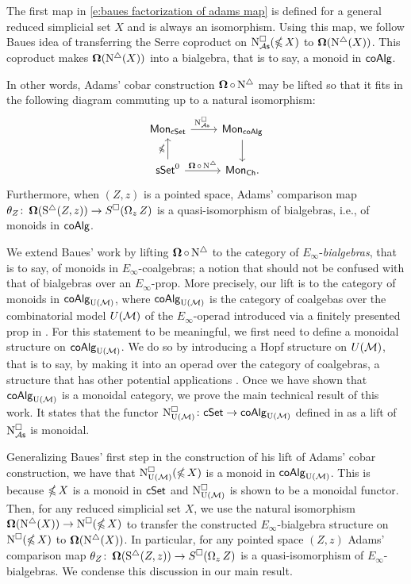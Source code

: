 The first map in \eqref{e:baues factorization of adams map} is defined for a general reduced simplicial set $X$ and is always an isomorphism.
Using this map, we follow Baues idea of transferring the Serre coproduct on $\operatorname{N^{\square}_{{\mathcal{A}\mathsf{s}}}}(\operatorname{\mathbb{\Omega}} X)$ to $\operatorname{\mathbf{\Omega}}(\operatorname{N^{\triangle}}(X))$. This coproduct makes $\operatorname{\mathbf{\Omega}}(\operatorname{N^{\triangle}}(X))$ into a bialgebra, that is to say, a monoid in $\mathsf{coAlg}$.

In other words,  Adams' cobar construction $\operatorname{\mathbf{\Omega}} \circ \operatorname{N^{\triangle}}$ may be lifted so that it fits in the following diagram commuting up to a natural isomorphism:
\[
\begin{tikzcd}
\Mon_{\cSet} \arrow[r, "\cchainsAS \ "] & \Mon_{\coAlg} \arrow[d] \\
\sSet^0 \arrow[r, "\cobar \circ \schains"] \arrow[u, "\ccobar"] & \Mon_{\Ch}.
\end{tikzcd}
\]
Furthermore, when $(Z, z)$ is a pointed space, Adams' comparison map $\theta_Z \colon \operatorname{\mathbf{\Omega}}(\operatorname{S^{\triangle}}(Z, z)) \to S^{\square}(\operatorname{\Omega}_z Z)$ is a quasi-isomorphism of bialgebras, i.e., of monoids in $\mathsf{coAlg}$.

We extend Baues' work by lifting $\operatorname{\mathbf{\Omega}} \circ \operatorname{N^{\triangle}}$ to the category of $E_{\infty}$-\textit{bialgebras}, that is to say, of monoids in $E_{\infty}$-coalgebras; a notion that should not be confused with that of bialgebras over an $E_{\infty}$-prop.
More precisely, our lift is to the category of monoids in $\mathsf{coAlg}_{\operatorname{U}(\mathcal{M})}$, where $\mathsf{coAlg}_{\operatorname{U}(\mathcal{M})}$ is the category of coalgebas over the combinatorial model $U(\mathcal{M})$ of the $E_{\infty}$-operad introduced via a finitely presented prop in \cite{medina2020prop1}.
For this statement to be meaningful, we first need to define a monoidal structure on $\mathsf{coAlg}_{\operatorname{U}(\mathcal{M})}$.
We do so by introducing a Hopf structure on $U(\mathcal{M})$, that is to say, by making it into an operad over the category of coalgebras, a structure that has other potential applications \cite{livernet2008hopf}.
Once we have shown that $\mathsf{coAlg}_{\operatorname{U}(\mathcal{M})}$ is a monoidal category, we prove the main technical result of this work.
It states that the functor $\operatorname{N^{\square}_{{\operatorname{U}(\mathcal{M})}}} \colon \mathsf{cSet} \to \mathsf{coAlg}_{\operatorname{U}(\mathcal{M})}$ defined in \cite{medina2021cubical} as a lift of $\operatorname{N^{\square}_{{\mathcal{A}\mathsf{s}}}}$ is monoidal.

Generalizing Baues' first step in the construction of his lift of Adams' cobar construction, we have that $\operatorname{N^{\square}_{{\operatorname{U}(\mathcal{M})}}}(\operatorname{\mathbb{\Omega}} X)$ is a monoid in $\mathsf{coAlg}_{\operatorname{U}(\mathcal{M})}$.
This is because $\operatorname{\mathbb{\Omega}} X$ is a monoid in $\mathsf{cSet}$ and $\operatorname{N^{\square}_{{\operatorname{U}(\mathcal{M})}}}$ is shown to be a monoidal functor. Then, for any reduced simplicial set $X$, we use the natural isomorphism $\operatorname{\mathbf{\Omega}}(\operatorname{N^{\triangle}}(X)) \to \operatorname{N^{\square}}(\operatorname{\mathbb{\Omega}} X)$ to transfer the constructed $E_{\infty}$-bialgebra structure on $\operatorname{N^{\square}}(\operatorname{\mathbb{\Omega}} X)$ to $\operatorname{\mathbf{\Omega}}(\operatorname{N^{\triangle}}(X))$.
In particular, for any pointed space $(Z, z)$ Adams' comparison map $\theta_Z \colon \operatorname{\mathbf{\Omega}}(\operatorname{S^{\triangle}}(Z, z)) \to S^{\square}(\operatorname{\Omega}_z Z)$ is a quasi-isomorphism of $E_{\infty}$-bialgebras.
We condense this discussion in our main result.

